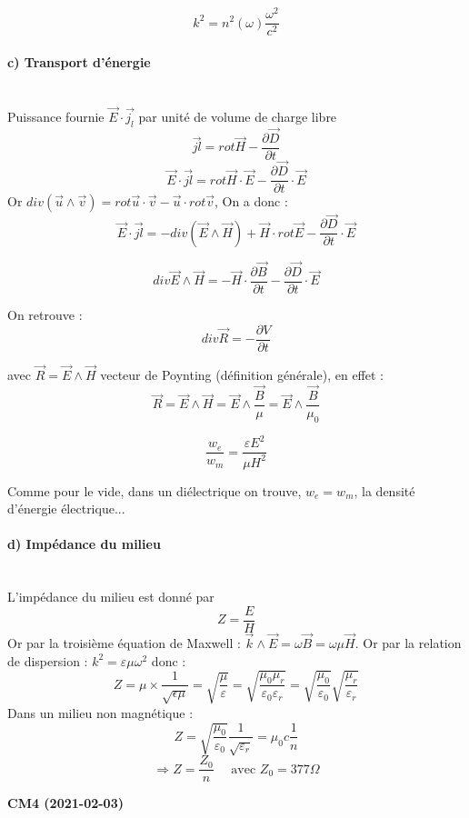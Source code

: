 \documentclass[12pt,a4paper]{report}
\begin{document}
\[
	k^2 = n^2(\omega) \dfrac{\omega^2}{c^2}
\]

\paragraph{c) Transport d'énergie}\quad \\
Puissance fournie \(\vec{E} \cdot \vec{j_l}\) par unité de volume de charge libre
\[
	\vec{jl} = rot \vec{H} - \dfrac{\partial \vec{D}}{\partial t}
\]
\[
	\vec{E} \cdot \vec{jl} = rot \vec{H} \cdot \vec{E} - \dfrac{\partial \vec{D}}{\partial t} \cdot \vec{E}
\]
Or \(div (\vec{u} \wedge \vec{v}) = rot \vec{u} \cdot \vec{v} - \vec{u} \cdot rot \vec{v}\), On a donc :
\[
	\vec{E} \cdot \vec{jl} = - div (\vec{E} \wedge \vec{H}) + \vec{H} \cdot rot \vec{E} - \dfrac{\partial \vec{D}}{\partial t} \cdot \vec{E}
\]

\begin{equation}
	div \vec{E} \wedge \vec{H} = - \vec{H} \cdot \dfrac{\partial \vec{B}}{\partial t} - \dfrac{\partial \vec{D}}{\partial t} \cdot \vec{E}
\end{equation}

On retrouve :
\[
	div \vec{R} = - \dfrac{\partial V}{\partial t}
\]

avec \(\vec{R} = \vec{E} \wedge \vec{H}\) vecteur de Poynting (définition générale), en effet :
\[
	\vec{R} = \vec{E} \wedge \vec{H} = \vec{E} \wedge \dfrac{\vec{B}}{\mu} = \vec{E} \wedge \dfrac{\vec{B}}{\mu_0}
\]

\begin{equation}
	\dfrac{w_e}{w_m} = \dfrac{\varepsilon E^2}{\mu H^2}
\end{equation}

Comme pour le vide, dans un diélectrique on trouve, \(w_e = w_m\), la densité d'énergie électrique...

\paragraph{d) Impédance du milieu} \quad	\\
L'impédance du milieu est donné par 
\[
	Z = \dfrac{E}{H}
\]
Or par la troisième équation de Maxwell : \(\vec{k} \wedge \vec{E} = \omega \vec{B} = \omega \mu \vec{H}\).
Or par la relation de dispersion : \(k^2 = \varepsilon\mu\omega^2\) donc :
\[
	Z = \mu \times \dfrac{1}{\sqrt{\epsilon\mu}} = \sqrt{\dfrac{\mu}{\varepsilon}} = \sqrt{\dfrac{\mu_0 \mu_r}{\varepsilon_0 \varepsilon_r}} = \sqrt{\dfrac{\mu_0}{\varepsilon_0}} \sqrt{\dfrac{\mu_r}{\varepsilon_r}}
\]
Dans un milieu non magnétique :
\[
	Z = \sqrt{\dfrac{\mu_0}{\varepsilon_0}} \dfrac{1}{\sqrt{\varepsilon_r}} = \mu_0 c \dfrac{1}{n}
\]
\[
	\Rightarrow Z = \dfrac{Z_0}{n} \quad	 \text{ avec } Z_0 = 377 \Omega
\]
\begin{center}
\textbf{CM4 (2021-02-03)}
\end{center}
\end{document}
